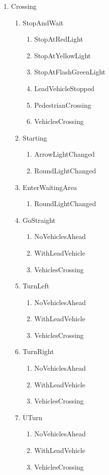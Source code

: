 \documentclass[lettersize,journal]{IEEEtran}
\begin{document}
\begin{enumerate}
    \item Crossing
    \begin{enumerate}
        \item StopAndWait
        \begin{enumerate}
            \item StopAtRedLight
            \item StopAtYellowLight
            \item StopAtFlashGreenLight
            \item LeadVehicleStopped
            \item PedestrianCrossing
            \item VehiclesCrossing
        \end{enumerate}
        \item Starting
        \begin{enumerate}
            \item ArrowLightChanged
            \item RoundLightChanged
        \end{enumerate}
        \item EnterWaitingArea
        \begin{enumerate}
            \item RoundLightChanged
        \end{enumerate}
        \item GoStraight
        \begin{enumerate}
            \item NoVehiclesAhead
            \item WithLeadVehicle
            \item VehiclesCrossing
        \end{enumerate}
        \item TurnLeft
        \begin{enumerate}
            \item NoVehiclesAhead
            \item WithLeadVehicle
            \item VehiclesCrossing
        \end{enumerate}
        \item TurnRight
        \begin{enumerate}
            \item NoVehiclesAhead
            \item WithLeadVehicle
            \item VehiclesCrossing
        \end{enumerate}
        \item UTurn
        \begin{enumerate}
            \item NoVehiclesAhead
            \item WithLeadVehicle
            \item VehiclesCrossing
        \end{enumerate}
    \end{enumerate}
    

\end{enumerate}
\end{document}
